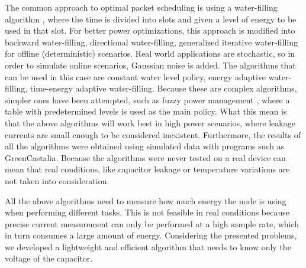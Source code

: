 The common approach to optimal packet scheduling is using a water-filling algorithm
\cite{yang2012optimal}\cite{huang2013utility}, where the time
is divided into slots and given a level of energy to be used in that slot. For better power
optimizations, this approach is modified into backward water-filling, directional water-filling,
generalized iterative water-filling \cite{wang2015iterative} for offline (deterministic) scenarios.
Real world applications are stochastic, so in order to simulate online scenarios, Gaussian noise is
added. The algorithms that can be used in this case are constant water level policy, energy
adaptive water-filling\cite{ozel2012optimal}, time-energy adaptive
water-filling\cite{ozel2011transmission}.
Because these are complex algorithms, simpler ones have been attempted, such as fuzzy power
management\cite{aoudia2016fuzzy} , where a table with predetermined levels is used as the main policy.
What this mean is that the above algorithms will work best in high power scenarios, where leakage
currents are small enough to be considered inexistent. Furthermore, the results of all the
algorithms were obtained using simulated data with programs such as
GreenCastalia\cite{benedetti2013greencastalia}. Because the algorithms were never tested on a
real device can mean that real conditions, like capacitor leakage or temperature variations are not taken into consideration.

All the above algorithms need to measure how much energy the node is using when performing
different tasks. This is not feasible in real conditions because precise current measurement can only be
performed at a high sample rate, which in turn consumes a large amount of energy. Considering the
presented problems, we developed a lightweight and efficient algorithm that needs to know only the
voltage of the capacitor.

